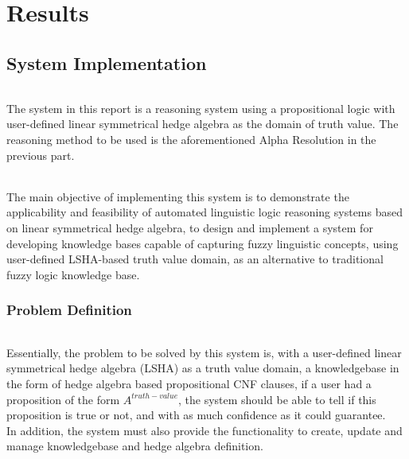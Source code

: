 \documentclass[../gr-final.tex]{subfiles}
\begin{document}
\lstset{language=Haskell}
%
\part{Results}
\chapter{System Implementation}

\paragraph{} The system in this report is a reasoning system using a
propositional logic with user-defined linear symmetrical hedge algebra
as the domain of truth value. The reasoning method to be used is the
aforementioned Alpha Resolution in the previous part.
	
\paragraph{} The main objective of implementing this system is to demonstrate the applicability and feasibility of automated linguistic logic reasoning systems based on linear symmetrical hedge algebra, to design and implement a system for developing knowledge bases capable of capturing fuzzy linguistic 
concepts, using user-defined LSHA-based truth value domain, as an alternative to traditional fuzzy logic knowledge base.



\section{Problem Definition}

\paragraph{}Essentially, the problem to be solved by this system is,
with a user-defined linear symmetrical hedge algebra (LSHA) as a truth value
domain, a knowledgebase in the form of hedge algebra based
propositional CNF  clauses, if a user had a proposition of the form
\(A^{truth-value}\), the system should be able to tell if this
proposition is true or not, and with as much confidence as it could guarantee.\\
In addition, the system must also provide the
functionality to create, update and manage knowledgebase and
hedge algebra definition. 
\end{document}
